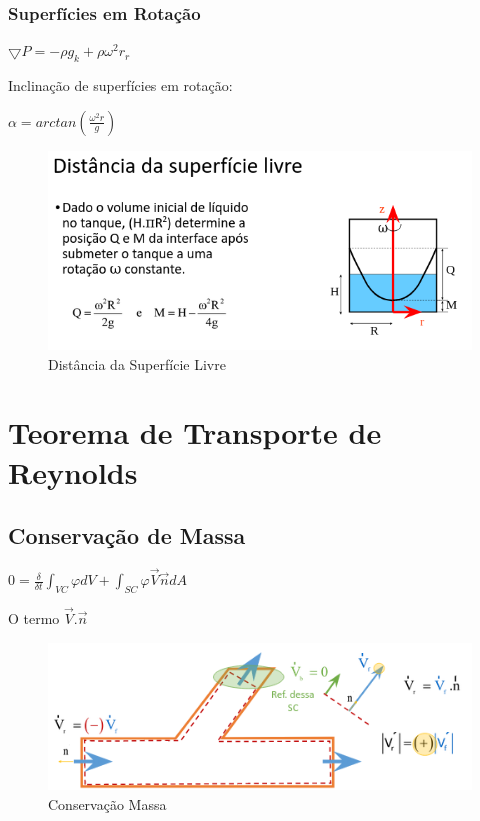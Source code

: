 \documentclass[a4paper, 12pt]{article}
\begin{document}
\subsubsection{Superfícies em Rotação}
	\begin{center}
		\Large
		$
		\bigtriangledown P = - \rho g_k + \rho \omega ^2 r_r
		$
	\end{center}	
	Inclinação de superfícies em rotação:
	\begin{center}
		\Large
		$
		\alpha = arctan(\frac{\omega ^2 r}{g})
		$
	\end{center}
	\begin{figure}[h]
		\centering
		\includegraphics[width=0.8\linewidth]{imagens/aa2}
		\caption{Distância da Superfície Livre}
		\label{fig:aa2}
	\end{figure}
	

\newpage
\section{Teorema de Transporte de Reynolds}
\subsection{Conservação de Massa}
	\begin{center}
		\Large
		$
		0 = \frac{\delta}{\delta t} \int_{VC}\varphi dV + \int_{SC} \varphi \vec{V} \vec{n} dA 
		$
	\end{center}
	O termo $\vec{V}.\vec{n}$
	\begin{figure}[h]
		\centering
		\includegraphics[width=0.7\linewidth]{imagens/rey}
		\caption{Conservação Massa}
		\label{fig:rey}
	\end{figure}
	
\end{document}
